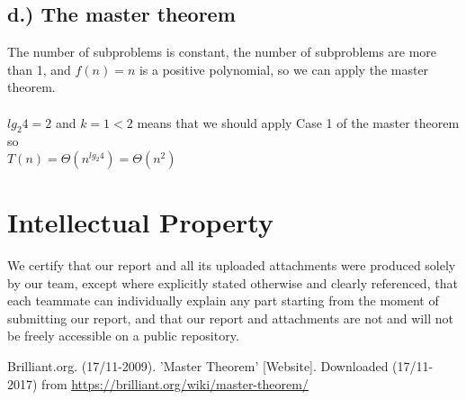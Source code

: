 \documentclass{article}
\begin{document}
\subsection*{d.) The master theorem}
The number of subproblems is constant, the number of subproblems are more than 1, and $f(n) = n$ is a positive polynomial, so we can apply the master theorem\cite{MT}. \\
\\
$lg_2 4 = 2$ and $k=1<2$ means that we should apply Case 1 of the master theorem so \\ $T(n) = \Theta(n^{lg_2 4}) = \Theta(n^2)$

\section{Intellectual Property}
We certify that our report and all its uploaded attachments were produced solely by our team,
except where explicitly stated otherwise and clearly referenced, that each teammate can individually
explain any part starting from the moment of submitting our report, and that our
report and attachments are not and will not be freely accessible on a public repository.
\newpage
\begin{thebibliography}{references}
	Brilliant.org.
    (17/11-2009).
    'Master Theorem' [Website].
    Downloaded (17/11-2017) from \url{https://brilliant.org/wiki/master-theorem/}
\end{thebibliography}
\end{document}
